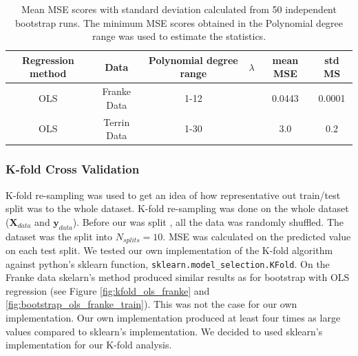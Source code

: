 \begin{table}
    \centering
    \caption{Mean MSE scores with standard deviation calculated from 50
    independent bootstrap runs. The minimum MSE scores obtained in the
Polynomial degree range was used to estimate the statistics.}  
    \label{tab:boots_error} 
    \begin{tabular}{|c|c|c|c|c|c|}
        \hline
        Regression method & Data & Polynomial degree range & $\lambda $ & mean MSE & std MS \\ 
        \hline
        OLS &  Franke Data & 1-12 & & 0.0443&  0.0001 \\
        \hline
        OLS & Terrin Data & 1-30 & &    3.0    &     0.2     \\ 
        \hline
         
    \end{tabular} 
\end{table}


\subsubsection{K-fold Cross Validation}

K-fold re-sampling was used to get an idea of how representative out train/test split
was to the whole dataset. K-fold re-sampling was done on the whole dataset
($\bm{X} _{data}  $ and $\bm{y} _{data} $). Before our was split 
, all the data was randomly shuffled. The dataset was the split into
$N_{splits} = 10 $. MSE was calculated on the predicted value on each test
split. We tested our own implementation of the K-fold algorithm against
python's sklearn function, \verb|sklearn.model_selection.KFold|. On the Franke
data skelarn's method produced similar results as for bootstrap with OLS
regression (see Figure \ref{fig:kfold_ols_franke} and
\ref{fig:bootstrap_ols_franke_train}). This was not the case for our own
implementation. Our own implementation produced at least four times as large
values compared to sklearn's implementation. We decided to used sklearn's
implementation for our K-fold analysis.  
    

